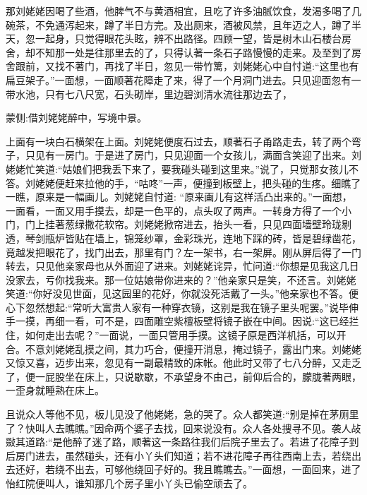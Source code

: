\begin{parag}
    那刘姥姥因喝了些酒，他脾气不与黄酒相宜，且吃了许多油腻饮食，发渴多喝了几碗茶，不免通泻起来，蹲了半日方完。及出厕来，酒被风禁，且年迈之人，蹲了半天，忽一起身，只觉得眼花头眩，辨不出路径。四顾一望，皆是树木山石楼台房舍，却不知那一处是往那里去的了，只得认著一条石子路慢慢的走来。及至到了房舍跟前，又找不著门，再找了半日，忽见一带竹篱，刘姥姥心中自忖道:“这里也有扁豆架子。”一面想，一面顺著花障走了来，得了一个月洞门进去。只见迎面忽有一带水池，只有七八尺宽，石头砌岸，里边碧浏清水流往那边去了，\begin{note}蒙侧:借刘姥姥醉中，写境中景。\end{note}上面有一块白石横架在上面。刘姥姥便度石过去，顺著石子甬路走去，转了两个弯子，只见有一房门。于是进了房门，只见迎面一个女孩儿，满面含笑迎了出来。刘姥姥忙笑道:“姑娘们把我丢下来了，要我碰头碰到这里来。”说了，只觉那女孩儿不答。刘姥姥便赶来拉他的手，“咕咚”一声，便撞到板壁上，把头碰的生疼。细瞧了一瞧，原来是一幅画儿。刘姥姥自忖道: “原来画儿有这样活凸出来的。”一面想，一面看，一面又用手摸去，却是一色平的，点头叹了两声。一转身方得了一个小门，门上挂著葱绿撒花软帘。刘姥姥掀帘进去，抬头一看，只见四面墙壁玲珑剔透，琴剑瓶炉皆贴在墙上，锦笼纱罩，金彩珠光，连地下踩的砖，皆是碧绿凿花，竟越发把眼花了，找门出去，那里有门？左一架书，右一架屏。刚从屏后得了一门转去，只见他亲家母也从外面迎了进来。刘姥姥诧异，忙问道:“你想是见我这几日没家去，亏你找我来。那一位姑娘带你进来的？”他亲家只是笑，不还言。刘姥姥笑道:“你好没见世面，见这园里的花好，你就没死活戴了一头。”他亲家也不答。便心下忽然想起:“常听大富贵人家有一种穿衣镜，这别是我在镜子里头呢罢。”说毕伸手一摸，再细一看，可不是，四面雕空紫檀板壁将镜子嵌在中间。因说:“这已经拦住，如何走出去呢？”一面说，一面只管用手摸。这镜子原是西洋机括，可以开合。不意刘姥姥乱摸之间，其力巧合，便撞开消息，掩过镜子，露出门来。刘姥姥又惊又喜，迈步出来，忽见有一副最精致的床帐。他此时又带了七八分醉，又走乏了，便一屁股坐在床上，只说歇歇，不承望身不由己，前仰后合的，朦胧著两眼，一歪身就睡熟在床上。
\end{parag}


\begin{parag}
    且说众人等他不见，板儿见没了他姥姥，急的哭了。众人都笑道:“别是掉在茅厕里了？快叫人去瞧瞧。”因命两个婆子去找，回来说没有。众人各处搜寻不见。袭人敁敠其道路:“是他醉了迷了路，顺著这一条路往我们后院子里去了。若进了花障子到后房门进去，虽然碰头，还有小丫头们知道；若不进花障子再往西南上去，若绕出去还好，若绕不出去，可够他绕回子好的。我且瞧瞧去。”一面想，一面回来，进了怡红院便叫人，谁知那几个房子里小丫头已偷空顽去了。
\end{parag}



